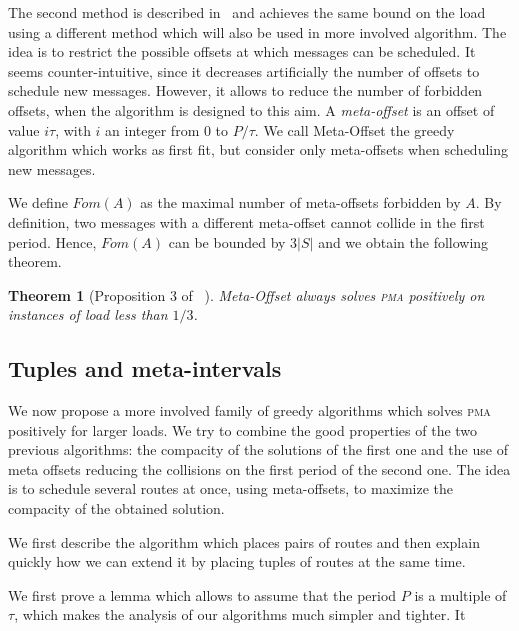 \documentclass[10pt, conference, letterpaper]{IEEEtran}
\newtheorem{theorem}{Theorem}
\newcommand\pma{\textsc{pma}\xspace}
\begin{document}
The second method is described  in~\cite{barth2018deterministic} and achieves the same bound on the load using a different method which will also be used in more involved algorithm.
The idea is to restrict the possible offsets at which messages can be scheduled. It seems counter-intuitive, since it decreases artificially the number of offsets to schedule new messages. However, it allows to reduce the number of forbidden offsets, when the 
algorithm is designed to this aim. A \emph{meta-offset} is an offset of value $i\tau$,
with $i$ an integer from $0$ to $P / \tau$. We call Meta-Offset the greedy algorithm
which works as first fit, but consider only meta-offsets when scheduling new messages. 

We define $Fom(A)$ as the maximal number of meta-offsets forbidden by $A$. 
 By definition, two messages with a different meta-offset cannot collide in the first period.
Hence, $Fom(A)$ can be bounded by $3|S|$ and we obtain the following theorem.


\begin{theorem}[Proposition 3 of~\cite{barth2018deterministic} ]
Meta-Offset always solves \pma positively on instances of load less than
$1/3$.
\end{theorem}

\subsection{Tuples and meta-intervals}

We now propose a more involved family of greedy algorithms which 
solves \pma positively for larger loads. We try to combine the good properties of the two previous algorithms: the compacity of the solutions of the first one and the use of meta offsets reducing the collisions on the first period of the second one.
The idea is to schedule several routes at once, using meta-offsets, to maximize the compacity of the obtained solution. 


We first describe the algorithm which places pairs of routes and then explain quickly how we can extend it by placing tuples of routes at the same time.

We first prove a lemma which allows to assume that the period $P$ is a multiple of $\tau$, 
which makes the analysis of our algorithms much simpler and tighter. It 
\end{document}
